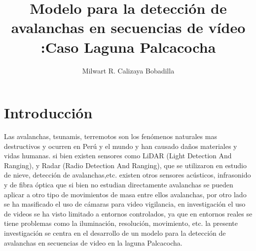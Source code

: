\documentclass[a4paper,11pt]{report}
\title{Modelo para la detección de avalanchas en secuencias de vídeo :Caso Laguna Palcacocha }
\author{Milwart R. Calizaya Bobadilla}
\begin{document}
\maketitle


 \chapter{Introducción}
Las avalanchas, tsunamis, terremotos son los fenómenos naturales  mas destructivos  y ocurren en Perú y el mundo y han causado daños materiales y vidas humanas. 
si bien existen sensores como  LiDAR (Light Detection And Ranging), y Radar (Radio Detection And Ranging), que se utilizaron en estudio de nieve, detección de avalanchas,etc. existen otros sensores acústicos, infrasonido y de fibra óptica 
que si bien no estudian directamente avalanchas se pueden aplicar a otro tipo de movimientos de masa entre ellos avalanchas, por otro lado se ha masificado el uso de  cámaras para video vigilancia, en investigación el uso de videos se ha visto limitado a entornos controlados, ya que en entornos reales se tiene problemas como  la iluminación, resolución, movimiento, etc. la presente investigación se centra en el desarrollo de un modelo para la detección de avalanchas en secuencias de video en la laguna Palcacocha.
\end{document}
